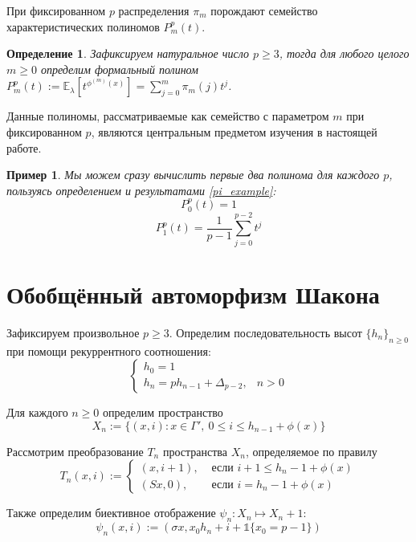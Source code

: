 \documentclass[14pt, a4paper, russian]{report}
\newtheorem{definition}{\indent Определение}
\newtheorem{example}{\indent Пример}
\begin{document}
При фиксированном $p$ распределения $\pi_m$ порождают семейство характеристических полиномов $P_m^p(t)$.

\begin{definition}\label{poly}
Зафиксируем натуральное число $p \ge 3$, тогда для любого целого $m \ge 0$ определим формальный полином $P_m^p(t):= \mathbb{E}_\lambda\left[ t^{\phi^{(m)}(x)}\right] = \sum\limits_{j=0}^m \pi_m(j) t^j$.
\end{definition}

Данные полиномы, рассматриваемые как семейство с параметром $m$ при фиксированном $p$, являются центральным предметом изучения в настоящей работе.

\begin{example}\label{poly_example}
Мы можем сразу вычислить первые два полинома для каждого $p$, пользуясь определением и результатами \cref{pi_example}:
\begin{equation}\label{eq:p_0}
P_0^p(t) = 1
\end{equation}
\begin{equation}\label{eq:p_1}
P_1^p(t) = \frac{1}{p-1} \sum\limits_{j=0}^{p-2} t^j
\end{equation}
\end{example}

\section{Обобщённый автоморфизм Шакона}

Зафиксируем произвольное $p \ge 3$. Определим последовательность высот $\{h_n\}_{n \ge 0}$ при помощи рекуррентного соотношения:
$$\begin{cases}
h_0 = 1 \\
h_n = p h_{n-1}+\Delta_{p-2},& n > 0 
\end{cases}$$

Для каждого $n \ge 0$ определим пространство
$$X_n:=\{(x,i): x \in \Gamma',\ 0 \le i \le h_{n-1} + \phi(x)\}$$

Рассмотрим преобразование $T_n$ пространства $X_n$, определяемое по правилу
$$T_n(x, i) := \begin{cases}
(x,i+1), & \text{ если } i+1 \le h_n - 1 + \phi(x) \\
(Sx,0), & \text{ если } i=h_n-1+\phi(x) \end{cases}$$

Также определим биективное отображение $\psi_n : X_n \mapsto X_n+1$:
$$\psi_n(x,i):=(\sigma x, x_0 h_n + i + \mathbb{1}\{x_0=p-1\})$$
\end{document}
